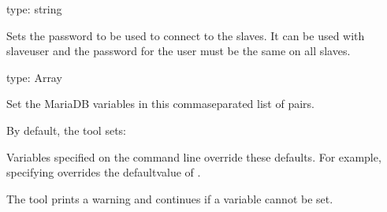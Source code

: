 \documentclass[letterpaper,10pt,english]{sphinxmanual}
\begin{document}

\begin{fulllineitems}
\label{\detokenize{mariadb-kill:cmdoption-mariadb-kill-slave-password}}
\sphinxAtStartPar
type: string

\sphinxAtStartPar
Sets the password to be used to connect to the slaves.
It can be used with \textendash{}slave\sphinxhyphen{}user and the password for the user must be the same
on all slaves.

\end{fulllineitems}


\begin{fulllineitems}
\label{\detokenize{mariadb-kill:cmdoption-mariadb-kill-set-vars}}
\sphinxAtStartPar
type: Array

\sphinxAtStartPar
Set the MariaDB variables in this comma\sphinxhyphen{}separated list of  pairs.

\sphinxAtStartPar
By default, the tool sets:

\begin{sphinxVerbatim}[commandchars=\\\{\}]
\end{sphinxVerbatim}

\sphinxAtStartPar
Variables specified on the command line override these defaults.  For
example, specifying  overrides the defaultvalue of .

\sphinxAtStartPar
The tool prints a warning and continues if a variable cannot be set.

\end{fulllineitems}
\end{document}
